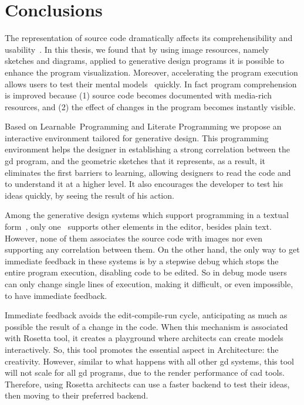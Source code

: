 
\chapter{Conclusions}
\label{chapter:conclusion}

The representation of source code dramatically affects its comprehensibility and usability~\citep{baecker1986design}. In this thesis, we found that by using image resources, namely sketches and diagrams, applied to generative design programs it is possible to enhance the program visualization. Moreover, accelerating the program execution allows users to test their mental models~\citep{brooks1977towards,robins2003learning} quickly. In fact program comprehension is improved because (1) source code becomes documented with media-rich resources, and (2) the effect of changes in the program becomes instantly visible.

Based on Learnable~Programming and Literate Programming we propose an interactive environment tailored for generative design. This programming environment helps the designer in establishing a strong correlation between the \gls{gd} program, and the geometric sketches that it represents, as a result, it eliminates the first barriers to learning, allowing designers to read the code and to understand it at a higher level. It also encourages the developer to test his ideas quickly, by seeing the result of his action.

Among the generative design systems which support programming in a textual form~\citep{aish2012designscript,lopes2011portable}, only one~\citep{lopes2011portable} supports other elements in the editor, besides plain text. However, none of them associates the source code with images nor even supporting any correlation between them. On the other hand, the only way to get immediate feedback in these systems is by a stepwise debug which stops the entire program execution, disabling code to be edited. So in debug mode users can only change single lines of execution, making it difficult, or even impossible, to have immediate feedback.

Immediate feedback avoids the edit-compile-run cycle, anticipating as much as possible the result of a change in the code. When this mechanism is associated with Rosetta tool, it creates a playground where architects can create models interactively. So, this tool promotes the essential aspect in Architecture: the creativity.  However, similar to what happens with all other \gls{gd} systems, this tool will not scale for all \gls{gd} programs, due to the render performance of \gls{cad} tools. Therefore, using Rosetta architects can use a faster backend to test their ideas, then moving to their preferred backend.

